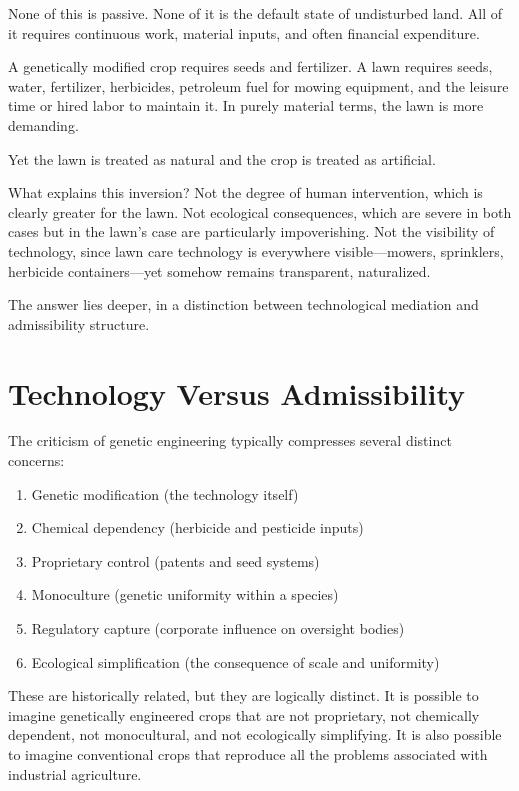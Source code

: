 \documentclass[12pt]{article}
\begin{document}
None of this is passive. None of it is the default state of undisturbed land. All of it requires continuous work, material inputs, and often financial expenditure.

A genetically modified crop requires seeds and fertilizer. A lawn requires seeds, water, fertilizer, herbicides, petroleum fuel for mowing equipment, and the leisure time or hired labor to maintain it. In purely material terms, the lawn is more demanding.

Yet the lawn is treated as natural and the crop is treated as artificial.

What explains this inversion? Not the degree of human intervention, which is clearly greater for the lawn. Not ecological consequences, which are severe in both cases but in the lawn's case are particularly impoverishing. Not the visibility of technology, since lawn care technology is everywhere visible—mowers, sprinklers, herbicide containers—yet somehow remains transparent, naturalized.

The answer lies deeper, in a distinction between technological mediation and admissibility structure.

\section{Technology Versus Admissibility}

The criticism of genetic engineering typically compresses several distinct concerns:

\begin{enumerate}
\item Genetic modification (the technology itself)
\item Chemical dependency (herbicide and pesticide inputs)
\item Proprietary control (patents and seed systems)
\item Monoculture (genetic uniformity within a species)
\item Regulatory capture (corporate influence on oversight bodies)
\item Ecological simplification (the consequence of scale and uniformity)
\end{enumerate}

These are historically related, but they are logically distinct. It is possible to imagine genetically engineered crops that are not proprietary, not chemically dependent, not monocultural, and not ecologically simplifying. It is also possible to imagine conventional crops that reproduce all the problems associated with industrial agriculture.
\end{document}
